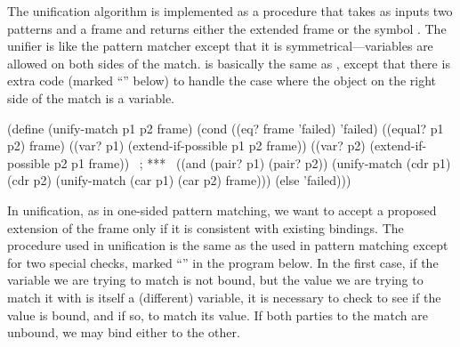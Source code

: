 \noindent
The unification algorithm is implemented as a procedure that takes as inputs
two patterns and a frame and returns either the extended frame or the symbol
.  The unifier is like the pattern matcher except that it is
symmetrical---variables are allowed on both sides of the match.
 is basically the same as , except that
there is extra code (marked ``\code{***}'' below) to handle the case where the
object on the right side of the match is a variable.

\begin{codeBlock}
(define (unify-match p1 p2 frame)
  (cond ((eq? frame 'failed) 'failed)
        ((equal? p1 p2) frame)
        ((var? p1) (extend-if-possible p1 p2 frame))
        ((var? p2) (extend-if-possible p2 p1 frame))  ~\textrm{; ***}~
        ((and (pair? p1) (pair? p2))
         (unify-match (cdr p1)
                      (cdr p2)
                      (unify-match (car p1)
                                   (car p2)
                                   frame)))
        (else 'failed)))
\end{codeBlock}

\noindent
In unification, as in one-sided pattern matching, we want to accept a proposed
extension of the frame only if it is consistent with existing bindings.  The
procedure  used in unification is the same as the
 used in pattern matching except for two special
checks, marked ``\code{***}'' in the program below.  In the first case, if the
variable we are trying to match is not bound, but the value we are trying to
match it with is itself a (different) variable, it is necessary to check to see
if the value is bound, and if so, to match its value.  If both parties to the
match are unbound, we may bind either to the other.

